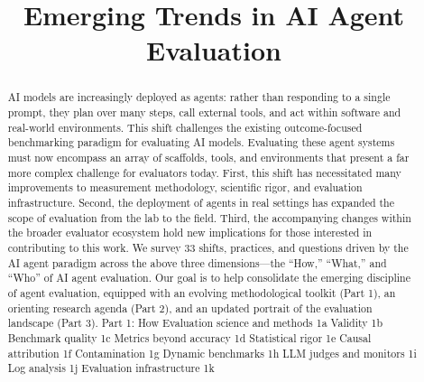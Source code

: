 \title{Emerging Trends in AI Agent Evaluation}

\maketitle

\begin{abstract}
AI models are increasingly deployed as agents: rather than responding to a single prompt, they plan over many steps, call external tools, and act within software and real-world environments. This shift challenges the existing outcome-focused benchmarking paradigm for evaluating AI models. Evaluating these agent systems must now encompass an array of scaffolds, tools, and environments that present a far more complex challenge for evaluators today. First, this shift has necessitated many improvements to measurement methodology, scientific rigor, and evaluation infrastructure. Second, the deployment of agents in real settings has expanded the scope of evaluation from the lab to the field. Third, the accompanying changes within the broader evaluator ecosystem hold new implications for those interested in contributing to this work. We survey 33 shifts, practices, and questions driven by the AI agent paradigm across the above three dimensions—the “How,” “What,” and “Who” of AI agent evaluation. Our goal is to help consolidate the emerging discipline of agent evaluation, equipped with an evolving methodological toolkit (Part 1), an orienting research agenda (Part 2), and an updated portrait of the evaluation landscape (Part 3). Part 1: How Evaluation science and methods 1a Validity 1b Benchmark quality 1c Metrics beyond accuracy 1d Statistical rigor 1e Causal attribution 1f Contamination 1g Dynamic benchmarks 1h LLM judges and monitors 1i Log analysis 1j Evaluation infrastructure 1k
\end{abstract}

